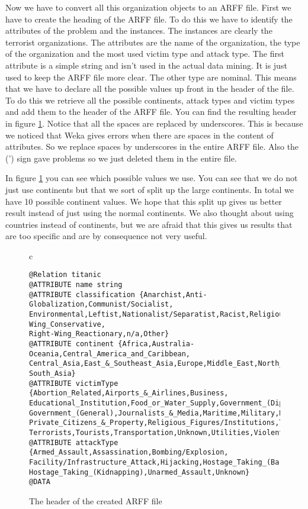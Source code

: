 \documentclass[a4]{article}
\begin{document}
Now we have to convert all this organization objects to an ARFF file. First we have to create the heading of the ARFF file. To do this we have to identify the attributes of the problem and the instances. The instances are clearly the terrorist organizations. The attributes are the name of the organization, the type of the organization and the most used victim type and attack type. The first attribute is a simple string and isn't used in the actual data mining. It is just used to keep the ARFF file more clear. The other type are nominal. This means that we have to declare all the possible values up front in the header of the file. To do this we retrieve all the possible continents, attack types and victim types and add them to the header of the ARFF file. You can find the resulting header in figure \ref{fig:arff_header}. Notice that all the spaces are replaced by underscores. This is because we noticed that Weka gives errors when there are spaces in the content of attributes. So we replace spaces by underscores in the entire ARFF file. Also the (') sign gave problems so we just deleted them in the entire file.\par
In figure \ref{fig:arff_header} you can see which possible values we use. You can see that we do not just use continents but that we sort of split up the large continents. In total we have 10 possible continent values. We hope that this split up gives us better result instead of just using the normal continents. We also thought about using countries instead of continents, but we are afraid that this gives us results that are too specific and are by consequence not very useful.
\begin{figure}[!ht]
\centering
\begin{tabular}{c}
\begin{lstlisting}
@Relation titanic
@ATTRIBUTE name string
@ATTRIBUTE classification {Anarchist,Anti-Globalization,Communist/Socialist,
Environmental,Leftist,Nationalist/Separatist,Racist,Religious,Right-Wing_Conservative,
Right-Wing_Reactionary,n/a,Other}
@ATTRIBUTE continent {Africa,Australia-Oceania,Central_America_and_Caribbean,
Central_Asia,East_&_Southeast_Asia,Europe,Middle_East,North_America,South_America,
South_Asia}
@ATTRIBUTE victimType {Abortion_Related,Airports_&_Airlines,Business,
Educational_Institution,Food_or_Water_Supply,Government_(Diplomatic),
Government_(General),Journalists_&_Media,Maritime,Military,NGO,Other,Police,
Private_Citizens_&_Property,Religious_Figures/Institutions,Telecommunication,
Terrorists,Tourists,Transportation,Unknown,Utilities,Violent_Political_Party}
@ATTRIBUTE attackType {Armed_Assault,Assassination,Bombing/Explosion,
Facility/Infrastructure_Attack,Hijacking,Hostage_Taking_(Barricade_Incident),
Hostage_Taking_(Kidnapping),Unarmed_Assault,Unknown}
@DATA
\end{lstlisting}
\end{tabular}
\caption{The header of the created ARFF file}
\label{fig:arff_header}
\end{figure}\par
\end{document}
